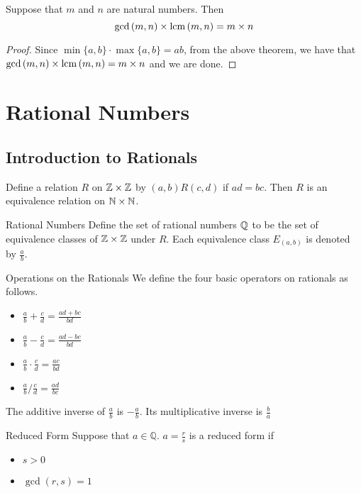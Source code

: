 \documentclass[a4paper]{article}
\begin{document}
\begin{prp}{}{} Suppose that $m$ and $n$ are natural numbers. Then $$\gcd{(m,n)}\times\operatorname{lcm}{(m,n)}=m\times n$$
\begin{proof} Since $\min\{a,b\}\cdot\max\{a,b\}=ab$, from the above theorem, we have that $\gcd{(m,n)}\times\operatorname{lcm}{(m,n)}=m\times n$ and we are done. 
\end{proof}
\end{prp}

\pagebreak
\section{Rational Numbers}
\subsection{Introduction to Rationals}
\begin{lmm}{}{} Define a relation $R$ on $\mathbb{Z}\times\mathbb{Z}$ by $(a,b)R(c,d)$ if $ad=bc$. Then $R$ is an equivalence relation on $\mathbb{N}\times\mathbb{N}$. 
\end{lmm}

\begin{defn}{Rational Numbers}{} Define the set of rational numbers $\mathbb{Q}$ to be the set of equivalence classes of $\mathbb{Z}\times\mathbb{Z}$ under $R$. Each equivalence class $E_{(a,b)}$ is denoted by $\frac{a}{b}$. 
\end{defn}

\begin{defn}{Operations on the Rationals}{} We define the four basic operators on rationals as follows. 
\begin{itemize}
\item $\frac{a}{b}+\frac{c}{d}=\frac{ad+bc}{bd}$
\item $\frac{a}{b}-\frac{c}{d}=\frac{ad-bc}{bd}$
\item $\frac{a}{b}\cdot\frac{c}{d}=\frac{ac}{bd}$
\item $\frac{a}{b}/\frac{c}{d}=\frac{ad}{bc}$
\end{itemize}
\end{defn}

\begin{prp}{}{} The additive inverse of $\frac{a}{b}$ is $-\frac{a}{b}$. Its multiplicative inverse is $\frac{b}{a}$
\end{prp}

\begin{defn}{Reduced Form}{} Suppose that $a\in\mathbb{Q}$. $a=\frac{r}{s}$ is a reduced form if
\begin{itemize}
\item $s>0$
\item $\gcd{(r,s)}=1$
\end{itemize}
\end{defn}
\end{document}
